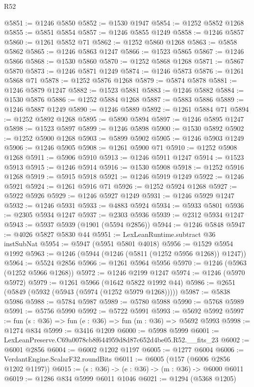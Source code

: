 \begin{lexlean}{R52}
\begin{coremodule}
@5851 := @1246 @5850
@5852 := @1530 @1947
@5854 := @1252 @5852 @1268
@5855 := @5851 @5854
@5857 := @1246 @5855 @1249
@5858 := @1246 @5857
@5860 := @1261 @5852 @71
@5862 := @1252 @5860 @1268
@5863 := @5858 @5862
@5865 := @1246 @5863 @1247
@5866 := @1523 @5865
@5867 := @1246 @5866
@5868 := @1530 @5860
@5870 := @1252 @5868 @1268
@5871 := @5867 @5870
@5873 := @1246 @5871 @1249
@5874 := @1246 @5873
@5876 := @1261 @5868 @71
@5878 := @1252 @5876 @1268
@5879 := @5874 @5878
@5881 := @1246 @5879 @1247
@5882 := @1523 @5881
@5883 := @1246 @5882
@5884 := @1530 @5876
@5886 := @1252 @5884 @1268
@5887 := @5883 @5886
@5889 := @1246 @5887 @1249
@5890 := @1246 @5889
@5892 := @1261 @5884 @71
@5894 := @1252 @5892 @1268
@5895 := @5890 @5894
@5897 := @1246 @5895 @1247
@5898 := @1523 @5897
@5899 := @1246 @5898
@5900 := @1530 @5892
@5902 := @1252 @5900 @1268
@5903 := @5899 @5902
@5905 := @1246 @5903 @1249
@5906 := @1246 @5905
@5908 := @1261 @5900 @71
@5910 := @1252 @5908 @1268
@5911 := @5906 @5910
@5913 := @1246 @5911 @1247
@5914 := @1523 @5913
@5915 := @1246 @5914
@5916 := @1530 @5908
@5918 := @1252 @5916 @1268
@5919 := @5915 @5918
@5921 := @1246 @5919 @1249
@5922 := @1246 @5921
@5924 := @1261 @5916 @71
@5926 := @1252 @5924 @1268
@5927 := @5922 @5926
@5929 := @1246 @5927 @1249
@5931 := @1246 @5929 @1247
@5932 := @1246 @5931
@5933 := @4883 @5924
@5934 := @5933 @5801
@5936 := @2305 @5934 @1247
@5937 := @2303 @5936
@5939 := @2312 @5934 @1247
@5943 := @5937 @5939 (@1901 (@5594 @2856))
@5944 := @1246 @5848
@5947 := @4026 @5827 @5830 @44
@5951 := LexLeanRuntime.subtract @36 instSubNat
@5954 := @5947 (@5951 @5801 @4018)
@5956 := @1529 @5954 @1992
@5963 := @1246 (@5944 (@1246 (@5811 (@1252 @5956 @1268)) @1247))
@5964 := @5524 @2856
@5966 := @1261 @5964 @5956
@5970 := @1246 (@5963 (@1252 @5966 @1268))
@5972 := @1246 @2199 @1247
@5974 := @1246 (@5970 @5972)
@5979 := @1261 @5966 (@1642 @5822 @1992 @44)
@5986 := @2651 (@5849 (@5932 (@5943 (@5974 (@1252 @5979 @1268)))))
@5987 := @5838 @5986
@5988 := @5784 @5987
@5989 := @5780 @5988
@5990 := @5768 @5989
@5991 := @5756 @5990
@5992 := @5722 @5991
@5993 := @5692 @5992
@5997 := fun (s : @36) => fun (e : @36) => fun (m : @36) => @5692 @5993
@5998 := @1274 @834
@5999 := @3416 @1209
@6000 := @5998 @5999
@6001 := LexLeanPreserve.C69a0078cb8f644959d8d87c652d4be05.R52.__fits_23
@6002 := @6001 @2856
@6004 := @6002 @1202 @1197
@6005 := @1277 @6004
@6006 := VerdantEngine.ScalarF32.roundBits
@6011 := @6005 (@157 (@6006 @2856 @1202 @1197))
@6015 := (s : @36) -> (e : @36) -> (m : @36) -> @6000 @6011
@6019 := @1286 @834 @5999 @6011 @1046
@6021 := @1294 (@5368 @1205)

\end{coremodule}
\end{lexlean}
